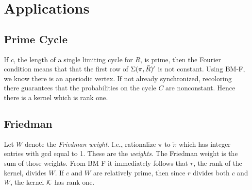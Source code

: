 
\section{Applications}
\label{sec:6.8}

\subsection{Prime Cycle}
\label{sec:6.8.1}

If $c$, the length of a single limiting cycle for $R$, is prime, 
then the Fourier condition means that that the first row of $\Sigma(\pi,{\bar R})'$ is not constant. 
Using BM-F, we know there is an aperiodic vertex. 
If not already synchronized, recoloring there guarantees that the probabilities on the cycle $C$ are nonconstant. 
Hence there is a kernel which is rank one.

\subsection{Friedman}
\label{sec:6.8.2}


Let $W$ denote the \textsl{Friedman weight\/}. I.e., rationalize $\pi$ to $\tilde\pi$ which has integer entries
with gcd equal to 1. These are the \textsl{weights\/}. The Friedman weight is the sum of those weights.
From BM-F it immediately follows that $r$, the rank of the kernel, divides $W$.
If $c$ and $W$ are relatively prime, then since $r$ divides both $c$ and $W$, the kernel ${\mathcal K}$ has rank one.
